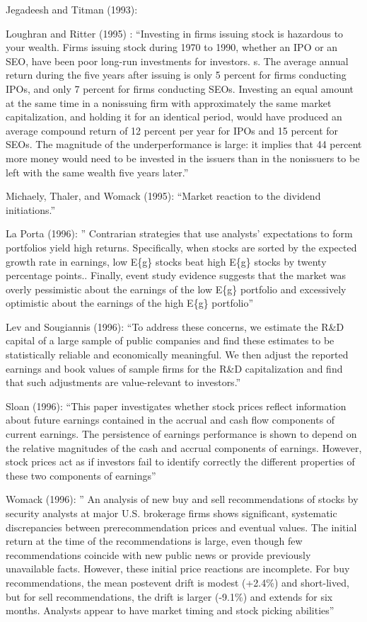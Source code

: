 \documentclass[
  letterpaper,
  DIV=11,
  numbers=noendperiod]{scrreprt}
\begin{document}
Jegadeesh and Titman (1993):

Loughran and Ritter (1995) : ``Investing in firms issuing stock is
hazardous to your wealth. Firms issuing stock during 1970 to 1990,
whether an IPO or an SEO, have been poor long-run investments for
investors. s. The average annual return during the five years after
issuing is only 5 percent for firms conducting IPOs, and only 7 percent
for firms conducting SEOs. Investing an equal amount at the same time in
a nonissuing firm with approximately the same market capitalization, and
holding it for an identical period, would have produced an average
compound return of 12 percent per year for IPOs and 15 percent for SEOs.
The magnitude of the underperformance is large: it implies that 44
percent more money would need to be invested in the issuers than in the
nonissuers to be left with the same wealth five years later.''

Michaely, Thaler, and Womack (1995): ``Market reaction to the dividend
initiations.''

La Porta (1996): '' Contrarian strategies that use analysts'
expectations to form portfolios yield high returns. Specifically, when
stocks are sorted by the expected growth rate in earnings, low E\{g\}
stocks beat high E\{g\} stocks by twenty percentage points.. Finally,
event study evidence suggests that the market was overly pessimistic
about the earnings of the low E\{g\} portfolio and excessively
optimistic about the earnings of the high E\{g\} portfolio''

Lev and Sougiannis (1996): ``To address these concerns, we estimate the
R\&D capital of a large sample of public companies and find these
estimates to be statistically reliable and economically meaningful. We
then adjust the reported earnings and book values of sample firms for
the R\&D capitalization and find that such adjustments are
value-relevant to investors.''

Sloan (1996): ``This paper investigates whether stock prices reflect
information about future earnings contained in the accrual and cash flow
components of current earnings. The persistence of earnings performance
is shown to depend on the relative magnitudes of the cash and accrual
components of earnings. However, stock prices act as if investors fail
to identify correctly the different properties of these two components
of earnings''

Womack (1996): '' An analysis of new buy and sell recommendations of
stocks by security analysts at major U.S. brokerage firms shows
significant, systematic discrepancies between prerecommendation prices
and eventual values. The initial return at the time of the
recommendations is large, even though few recommendations coincide with
new public news or provide previously unavailable facts. However, these
initial price reactions are incomplete. For buy recommendations, the
mean postevent drift is modest (+2.4\%) and short-lived, but for sell
recommendations, the drift is larger (-9.1\%) and extends for six
months. Analysts appear to have market timing and stock picking
abilities''
\end{document}

